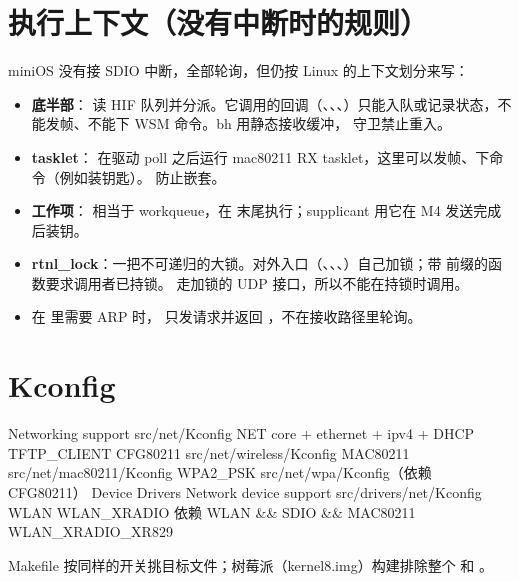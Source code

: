 \section{执行上下文（没有中断时的规则）}

miniOS 没有接 SDIO 中断，全部轮询，但仍按 Linux 的上下文划分来写：

\begin{itemize}
  \item \textbf{底半部}： 读 HIF 队列并分派。它调用的回调（、、、）只能入队或记录状态，不能发帧、不能下 WSM 命令。bh 用静态接收缓冲， 守卫禁止重入。
  \item \textbf{tasklet}： 在驱动 poll 之后运行 mac80211 RX tasklet，这里可以发帧、下命令（例如装钥匙）。 防止嵌套。
  \item \textbf{工作项}： 相当于 workqueue，在  末尾执行；supplicant 用它在 M4 发送完成后装钥。
  \item \textbf{rtnl\_lock}：一把不可递归的大锁。对外入口（、、、）自己加锁；带 \code{\_\_} 前缀的函数要求调用者已持锁。 走加锁的 UDP 接口，所以不能在持锁时调用。
  \item 在  里需要 ARP 时， 只发请求并返回 ，不在接收路径里轮询。
\end{itemize}

\section{Kconfig}

\begin{txtcode}
Networking support            src/net/Kconfig
  NET                         core + ethernet + ipv4 + DHCP
  TFTP_CLIENT
  CFG80211                    src/net/wireless/Kconfig
  MAC80211                    src/net/mac80211/Kconfig
  WPA2_PSK                    src/net/wpa/Kconfig（依赖 CFG80211）
Device Drivers
  Network device support      src/drivers/net/Kconfig
    WLAN
      WLAN_XRADIO             依赖 WLAN && SDIO && MAC80211
        WLAN_XRADIO_XR829
\end{txtcode}

Makefile 按同样的开关挑目标文件；树莓派（kernel8.img）构建排除整个  和 。

